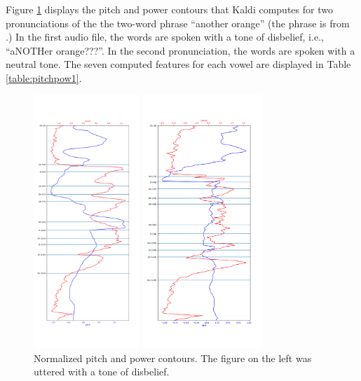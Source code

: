 \documentclass{article}
\begin{document}
Figure \ref{fig:pitchpow1} displays the pitch and power contours that Kaldi computes for two pronunciations of the the two-word phrase ``another orange'' (the phrase is from \cite{pierrehumbert1980phonology}.) In the first audio file, the words are spoken with a tone of disbelief, i.e., ``aNOTHer orange???''. In the second pronunciation, the words are spoken with a neutral tone. The seven computed features for each vowel are displayed in Table \ref{table:pitchpow1}.

\begin{figure}[htb]

\begin{minipage}[b]{.46\linewidth}
  \centering
  \centerline{\includegraphics[width=4.0cm]{orange_aNOTHer}}
\end{minipage}
\hfill
\begin{minipage}[b]{0.5\linewidth}
  \centering
  \centerline{\includegraphics[width=4.5cm]{orange_neutral}}
\end{minipage}
%
\caption{Normalized pitch and power contours. The figure on the left was uttered with a tone of disbelief.}
\label{fig:pitchpow1}
%
\end{figure}
\end{document}
